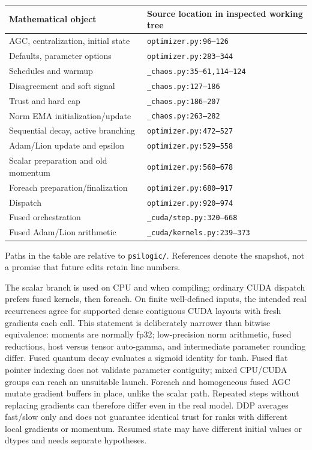 \documentclass[11pt,a4paper]{article}
\theoremstyle{definition}
\theoremstyle{remark}
\begin{document}
\begin{center}\small
\begin{tabular}{p{.38\linewidth}p{.53\linewidth}}
\toprule
Mathematical object & Source location in inspected working tree\\
\midrule
AGC, centralization, initial state & \texttt{optimizer.py:96--126}\\
Defaults, parameter options & \texttt{optimizer.py:283--344}\\
Schedules and warmup & \texttt{\_chaos.py:35--61,114--124}\\
Disagreement and soft signal & \texttt{\_chaos.py:127--186}\\
Trust and hard cap & \texttt{\_chaos.py:186--207}\\
Norm EMA initialization/update & \texttt{\_chaos.py:263--282}\\
Sequential decay, active branching & \texttt{optimizer.py:472--527}\\
Adam/Lion update and epsilon & \texttt{optimizer.py:529--558}\\
Scalar preparation and old momentum & \texttt{optimizer.py:560--678}\\
Foreach preparation/finalization & \texttt{optimizer.py:680--917}\\
Dispatch & \texttt{optimizer.py:920--974}\\
Fused orchestration & \texttt{\_cuda/step.py:320--668}\\
Fused Adam/Lion arithmetic & \texttt{\_cuda/kernels.py:239--373}\\
\bottomrule
\end{tabular}
\end{center}
Paths in the table are relative to \texttt{psilogic/}. References denote the
snapshot, not a promise that future edits retain line numbers.

The scalar branch is used on CPU and when compiling; ordinary CUDA dispatch
prefers fused kernels, then foreach. On finite well-defined inputs, the
intended real recurrences agree for supported dense contiguous CUDA layouts
with fresh gradients each call. This statement is deliberately narrower than
bitwise equivalence: moments are normally fp32; low-precision norm arithmetic,
fused reductions, host versus tensor auto-gamma, and intermediate parameter
rounding differ. Fused quantum decay evaluates a sigmoid identity for tanh.
Fused flat pointer indexing does not validate parameter contiguity; mixed
CPU/CUDA groups can reach an unsuitable launch. Foreach and homogeneous fused
AGC mutate gradient buffers in place, unlike the scalar path. Repeated steps
without replacing gradients can therefore differ even in the real model.
DDP averages fast/slow only and does not guarantee identical trust for ranks
with different local gradients or momentum. Resumed state may have different
initial values or dtypes and needs separate hypotheses.
\end{document}
